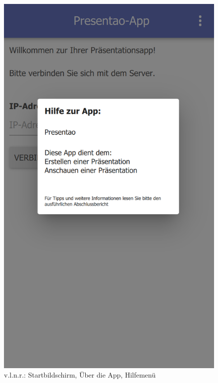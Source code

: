 \begin{figure}[ht!]
\begin{minipage}{0.31\linewidth}
		\includegraphics[scale=0.5]{GUI/Bilder/1_0_1_Startbildschirm_PopUP_Hilfe.PNG}
	\end{minipage}
	\caption{v.l.n.r.: Startbildschirm, Über die App, Hilfemenü{\tiny}}
	\label{client:Appstart}
\end{figure}

\newpage

